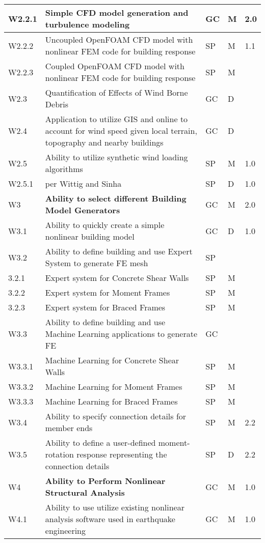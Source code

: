 \begin{longtable}{| p{} | p{} | p{} | p{} |  p{} |}
W2.2.1 & Simple CFD model generation and turbulence modeling & GC & M & 2.0 \\ \hline
W2.2.2 & Uncoupled OpenFOAM CFD model with nonlinear FEM code for building response & SP & M & 1.1 \\ \hline
W2.2.3 & Coupled OpenFOAM CFD model with nonlinear FEM code for building response & SP & M &  \\ \hline
W2.3 & Quantification of Effects of Wind Borne Debris & GC & D & \\ \hline
W2.4 & Application to utilize GIS and online to account for wind speed given local terrain, topography and nearby buildings & GC & D & \\ \hline
W2.5 & Ability to utilize synthetic wind loading algorithms & SP & M & 1.0  \\ \hline
W2.5.1 & per Wittig and Sinha & SP & D & 1.0  \\ \hhline{=====}
W3 & \textbf{Ability to select different Building Model Generators} & GC & M & 2.0 \\ \hline
W3.1 & Ability to quickly create a simple nonlinear building model & GC & D & 1.0 \\ \hline
W3.2  & Ability to define building and use Expert System to generate FE mesh & SP & &  \\ \hline
	3.2.1 & Expert system for Concrete Shear Walls & SP & M &  \\ \hline
	3.2.2 & Expert system for Moment Frames & SP & M &  \\ \hline
	3.2.3 & Expert system for  Braced Frames & SP & M &   \\ \hline
W3.3 & Ability to define building and use Machine Learning applications to generate FE & GC &  &  \\ \hline
	W3.3.1 & Machine Learning for Concrete Shear Walls & SP & M &  \\ \hline
	W3.3.2 & Machine Learning for Moment Frames & SP & M &  \\ \hline
	W3.3.3 & Machine Learning for Braced Frames & SP & M &   \\ \hline
	W3.4 & Ability to specify connection details for member ends & SP & M & 2.2 \\ \hline
	W3.5 & Ability to define a user-defined moment-rotation response representing the connection details & SP & D & 2.2 \\ \hline
	W4 & \textbf{Ability to Perform Nonlinear Structural Analysis} & GC & M & 1.0 \\ \hhline{=====}
W4.1 & Ability to use utilize existing nonlinear analysis software used in earthquake engineering & GC & M & 1.0 \\ \hline

\end{longtable}
